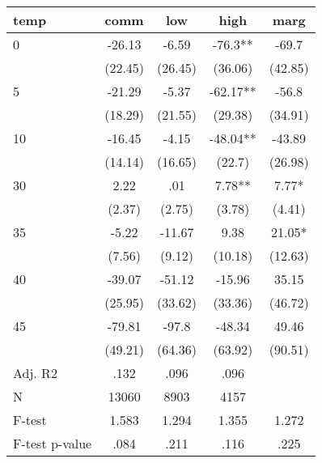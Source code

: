 \documentclass[]{article}
\begin{document}
\begin{tabular}{lcccc} \hline
temp & comm & low & high & marg \\ \hline
0 & -26.13 & -6.59 & -76.3** & -69.7 \\
 & (22.45) & (26.45) & (36.06) & (42.85) \\
5 & -21.29 & -5.37 & -62.17** & -56.8 \\
 & (18.29) & (21.55) & (29.38) & (34.91) \\
10 & -16.45 & -4.15 & -48.04** & -43.89 \\
 & (14.14) & (16.65) & (22.7) & (26.98) \\
30 & 2.22 & .01 & 7.78** & 7.77* \\
 & (2.37) & (2.75) & (3.78) & (4.41) \\
35 & -5.22 & -11.67 & 9.38 & 21.05* \\
 & (7.56) & (9.12) & (10.18) & (12.63) \\
40 & -39.07 & -51.12 & -15.96 & 35.15 \\
 & (25.95) & (33.62) & (33.36) & (46.72) \\
45 & -79.81 & -97.8 & -48.34 & 49.46 \\
 & (49.21) & (64.36) & (63.92) & (90.51) \\
\hline Adj. R2 & .132 & .096 & .096 &  \\
N & 13060 & 8903 & 4157 &  \\
F-test & 1.583 & 1.294 & 1.355 & 1.272 \\
 F-test p-value & .084 & .211 & .116 & .225 \\ \hline
\end{tabular}
\end{document}
